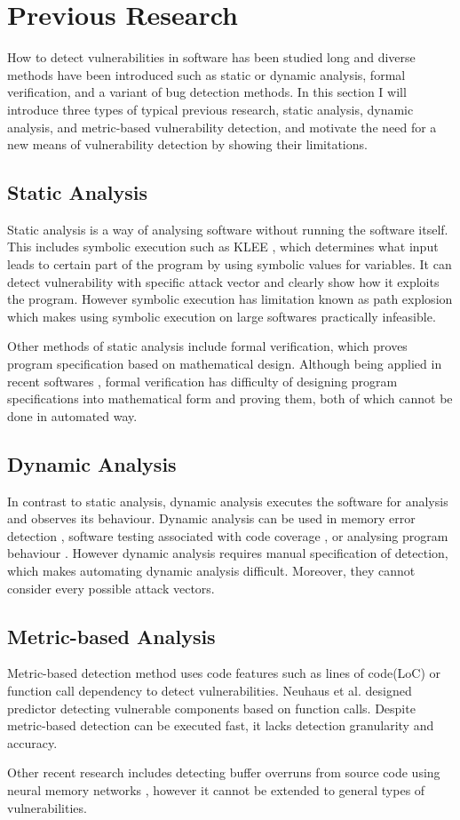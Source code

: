 \section{Previous Research}
\label{section:previous}

How to detect vulnerabilities in software has been studied long and diverse methods have been introduced such as static or dynamic analysis, formal verification, and a variant of bug detection methods.
In this section I will introduce three types of typical previous research, static analysis, dynamic analysis, and metric-based vulnerability detection,
and motivate the need for a new means of vulnerability detection by showing their limitations.

\subsection{Static Analysis}
Static analysis is a way of analysing software without running the software itself.
This includes symbolic execution such as KLEE \cite{cadar2008klee}, which determines what input leads to certain part of the program by using symbolic values for variables.
It can detect vulnerability with specific attack vector and clearly show how it exploits the program.
However symbolic execution has limitation known as path explosion which makes using symbolic execution on large softwares practically infeasible.

Other methods of static analysis include formal verification, which proves program specification based on mathematical design.
Although being applied in recent softwares \cite{rustbelt}, formal verification has difficulty of designing program specifications into mathematical form and proving them, both of which cannot be done in automated way.

\subsection{Dynamic Analysis}
In contrast to static analysis, dynamic analysis executes the software for analysis and observes its behaviour.
Dynamic analysis can be used in memory error detection \cite{valgrind}, software testing associated with code coverage \cite{huang2015code},
or analysing program behaviour \cite{newsome2005dynamic, enck2014taintdroid}.
However dynamic analysis requires manual specification of detection, which makes automating dynamic analysis difficult.
Moreover, they cannot consider every possible attack vectors.

\subsection{Metric-based Analysis}
Metric-based detection method uses code features such as lines of code(LoC) or function call dependency to detect vulnerabilities.
Neuhaus et al. \cite{neuhaus2007predicting} designed predictor detecting vulnerable components based on function calls.
Despite metric-based detection can be executed fast, it lacks detection granularity and accuracy.

Other recent research includes detecting buffer overruns from source code using neural memory networks \cite{choi2017end}, however it cannot be extended to general types of vulnerabilities.